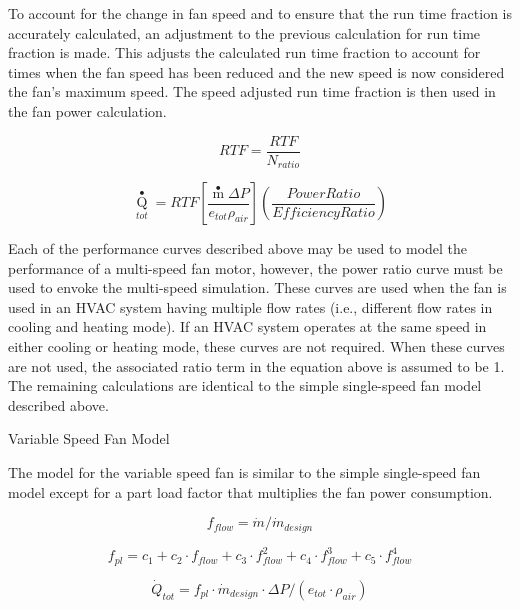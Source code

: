 To account for the change in fan speed and to ensure that the run time fraction is accurately calculated, an adjustment to the previous calculation for run time fraction is made. This adjusts the calculated run time fraction to account for times when the fan speed has been reduced and the new speed is now considered the fan's maximum speed. The speed adjusted run time fraction is then used in the fan power calculation.

\begin{equation}
RTF = \frac{RTF}{N_{ratio}}
\end{equation}

\begin{equation}
{\mathop Q\limits^ \bullet_{tot}} = RTF\left[ {\frac{{\mathop m\limits^ \bullet  \Delta P}}{{{e_{tot}}{\rho_{air}}}}} \right]\left( {\frac{{PowerRatio}}{{EfficiencyRatio}}} \right)
\end{equation}

Each of the performance curves described above may be used to model the performance of a multi-speed fan motor, however, the power ratio curve must be used to envoke the multi-speed simulation. These curves are used when the fan is used in an HVAC system having multiple flow rates (i.e., different flow rates in cooling and heating mode). If an HVAC system operates at the same speed in either cooling or heating mode, these curves are not required. When these curves are not used, the associated ratio term in the equation above is assumed to be 1. The remaining calculations are identical to the simple single-speed fan model described above.

Variable Speed Fan Model

The model for the variable speed fan is similar to the simple single-speed fan model except for a part load factor that multiplies the fan power consumption.

\begin{equation}
{f_{flow}} = \dot m/{\dot m_{design}}
\end{equation}

\begin{equation}
{f_{pl}} = {c_1} + {c_2} \cdot {f_{flow}} + {c_3} \cdot f_{flow}^2 + {c_4} \cdot f_{flow}^3 + {c_5} \cdot f_{flow}^4
\end{equation}

\begin{equation}
{\dot Q_{tot}} = {f_{pl}}\cdot {\dot m_{design}}\cdot \Delta P/\left( {{e_{tot}}\cdot {\rho_{air}}} \right)
\end{equation}

